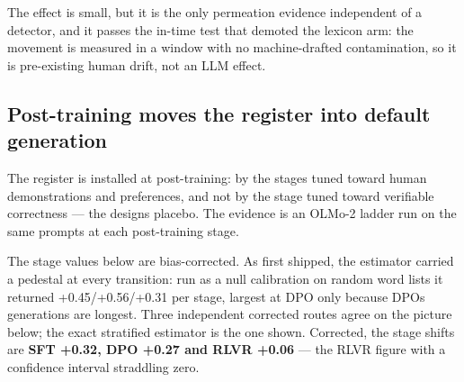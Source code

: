 The effect is small, but it is the only permeation evidence independent of a
detector, and it passes the in-time test that demoted the lexicon arm: the
movement is measured in a window with no machine-drafted contamination, so it
is pre-existing human drift, not an LLM effect.

\subsection{Post-training moves the register into default generation}\label{sec:posttraining}

The register is installed at post-training: by the stages tuned toward human
demonstrations and preferences, and not by the stage tuned toward verifiable
correctness --- the design\textquotesingle s placebo. The evidence is an OLMo-2 ladder run on
the same prompts at each post-training stage.

The stage values below are bias-corrected. As first shipped, the estimator
carried a pedestal at every transition: run as a null calibration on random
word lists it returned +0.45/+0.56/+0.31 per stage, largest at DPO only
because DPO\textquotesingle s generations are longest. Three independent corrected routes
agree on the picture below; the exact stratified estimator is the one shown.
Corrected, the stage shifts are \textbf{SFT +0.32, DPO +0.27 and RLVR +0.06} --- the
RLVR figure with a confidence interval straddling zero.

